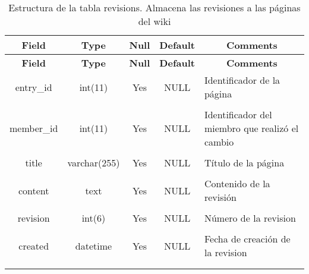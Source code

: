 %
%
\begin{longtable}{c c c c l}
	\multicolumn{1}{c}{\textbf{Field}} &
	\multicolumn{1}{c}{\textbf{Type}} &
	\multicolumn{1}{c}{\textbf{Null}} &
	\multicolumn{1}{c}{\textbf{Default}} &
	\multicolumn{1}{c}{\textbf{Comments}} \\ \hline \hline
\endfirsthead
	\multicolumn{1}{c}{\textbf{Field}} &
	\multicolumn{1}{c}{\textbf{Type}} &
	\multicolumn{1}{c}{\textbf{Null}} &
	\multicolumn{1}{c}{\textbf{Default}} &
	\multicolumn{1}{c}{\textbf{Comments}} \\ \hline \hline
\endhead \endfoot
	entry\_id & int(11) & Yes & NULL & \parbox[t]{0.35\textwidth}{Identificador de la página} \\ \\  \hline
	member\_id & int(11) & Yes & NULL & \parbox[t]{0.35\textwidth}{Identificador del miembro que realizó el cambio} \\ \\  \hline
	title & varchar(255) & Yes & NULL & \parbox[t]{0.35\textwidth}{Título de la página} \\ \\  \hline
	content & text & Yes & NULL & \parbox[t]{0.35\textwidth}{Contenido de la revisión} \\ \\  \hline
	revision & int(6) & Yes & NULL & \parbox[t]{0.35\textwidth}{Número de la revision} \\ \\  \hline
	created & datetime & Yes & NULL & \parbox[t]{0.35\textwidth}{Fecha de creación de la revision} \\ \\
 \caption[Estructura de la tabla revisions]{Estructura de la tabla revisions. Almacena las revisiones a las páginas del wiki} \label{tab:wiki_revisions-structure} \\ 
\end{longtable}

